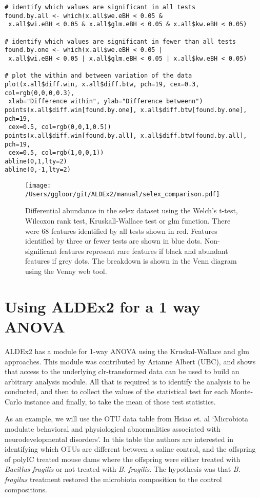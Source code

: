 \documentclass[11pt]{article}
\begin{document}
\begin{verbatim}
# identify which values are significant in all tests
found.by.all <- which(x.all$we.eBH < 0.05 & 
 x.all$wi.eBH < 0.05 & x.all$glm.eBH < 0.05 & x.all$kw.eBH < 0.05)

# identify which values are significant in fewer than all tests
found.by.one <- which(x.all$we.eBH < 0.05 | 
 x.all$wi.eBH < 0.05 | x.all$glm.eBH < 0.05 | x.all$kw.eBH < 0.05)

# plot the within and between variation of the data
plot(x.all$diff.win, x.all$diff.btw, pch=19, cex=0.3, col=rgb(0,0,0,0.3),
 xlab="Difference within", ylab="Difference betweenn")
points(x.all$diff.win[found.by.one], x.all$diff.btw[found.by.one], pch=19, 
 cex=0.5, col=rgb(0,0,1,0.5))
points(x.all$diff.win[found.by.all], x.all$diff.btw[found.by.all], pch=19, 
 cex=0.5, col=rgb(1,0,0,1))
abline(0,1,lty=2)
abline(0,-1,lty=2)
\end{verbatim}

\begin{figure}[!h]
\begin{center}
\texttt{[image: /Users/ggloor/git/ALDEx2/manual/selex\_comparison.pdf]}
\caption{Differential abundance in the selex dataset using the Welch's t-test, Wilcoxon rank test, Kruskall-Wallace test or  glm function. There were 68 features identified by all tests shown in red. Features identified by three or fewer tests are shown in blue dots.  Non-significant features represent rare features if black and abundant features if grey dots. The breakdown is shown in the Venn diagram using the Venny web tool\cite{oliveros:2007}. }
\label{selex}\vspace{-0.8cm}
\end{center}
\end{figure}

\section{Using ALDEx2 for a 1 way ANOVA}
ALDEx2 has a module for 1-way ANOVA using the Kruskal-Wallace and glm approaches. This module was contributed by Arianne Albert (UBC), and shows that access to the underlying clr-transformed data can be used to build an arbitrary analysis module. All that is required is to identify the analysis to be conducted, and then to collect the values of the statistical test for each Monte-Carlo instance and finally, to take the mean of those test statistics.

As an example, we will use the OTU data table from Hsiao et. al `Microbiota modulate behavioral and physiological abnormalities associated with neurodevelopmental disorders'\cite{Hsiao:2013}. In this table the authors are interested in identifying which OTUs are different between a saline control, and the offspring of polyIC treated mouse dams where the offspring were either treated with \emph{Bacillus fragilis} or not treated with \emph{B. fragilis}. The hypothesis was that \emph{B. fragilus} treatment restored the microbiota composition to the control compositions. 
\end{document}
